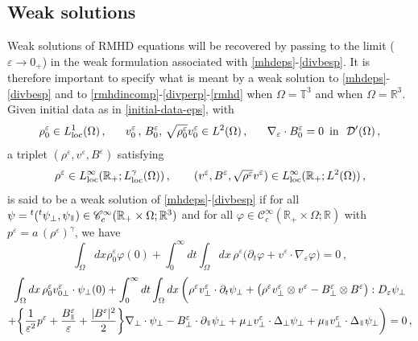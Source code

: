 \documentclass[11pt,reqno]{amsart}
\def \R{{\mathbb{R}}}
\def \T{{\mathbb{T}}}
\newcommand{\myparallel}{{\mkern3mu\vphantom{\perp}\vrule depth 0pt\mkern2mu\vrule depth 0pt\mkern3mu}}
\begin{document}
\subsection{Weak solutions}
\label{ss:ws} Weak solutions of  RMHD equations will be recovered by passing to the limit ($\varepsilon \rightarrow  0_+$) in the weak formulation associated with \eqref{mhdeps}-\eqref{divbesp}. It is therefore important to specify what is meant by a  weak solution to \eqref{mhdeps}-\eqref{divbesp} and to \eqref{rmhdincomp}-\eqref{divperp}-\eqref{rmhd} when $\Omega=\T^3$ and when $\Omega=\R^3$. Given initial data as in \eqref{initial-data-eps}, with
\begin{equation}
  \label{initial-data-ws}
  \rho_0^\varepsilon \in L_{\rm loc}^1(\Omega)\,, \quad \ \ 
  v_0^\varepsilon\,, \, B_0^\varepsilon, \, \sqrt{\rho_0^\varepsilon} v_0^\varepsilon \in L^2(\Omega)\,,\quad \ \ 
  \nabla_\varepsilon \cdot B_0^\varepsilon =0 \ \, \mbox{in }\  \mathcal{D}'(\Omega)\,,
\end{equation}
a triplet $(\rho^\varepsilon,v^\varepsilon, B^\varepsilon)$ satisfying
\begin{equation}
  \label{reg-triplet}
  \rho^\varepsilon \in L_{\rm loc}^\infty (\R_+; L_{\rm loc}^\gamma(\Omega))\,, \qquad
  (v^\varepsilon ,B^\varepsilon,  \sqrt{\rho^\varepsilon} v^\varepsilon ) \in L_{\rm loc}^\infty (\R_+; L^2(\Omega))\,,
\end{equation}
is said to be a weak solution of \eqref{mhdeps}-\eqref{divbesp} if for all $ \psi={}^t({}^t\psi_\perp,\psi_\myparallel) \in \mathscr{C}_c^\infty(\R_+\times\Omega;\R^3)$ and for all $ \varphi\in \mathscr{C}_c^\infty(\R_+\times\Omega;\R)$ with $ p^\varepsilon = a \, (\rho^\varepsilon)^\gamma $, we have
\begin{equation}
\label{eq:rho-eps}
\int_\Omega dx \rho_0^\varepsilon \varphi(0) +
\int_0^\infty dt \int_\Omega dx \, \rho^\varepsilon\big(\partial_t  \varphi+ v^\varepsilon \cdot \nabla_\varepsilon \varphi\big) =0 \,,
\end{equation}      
\begin{multline}
\label{eq:vperp-eps}
\int_\Omega dx \,\rho_0^\varepsilon v_{0 \perp }^\varepsilon \cdot \psi_\perp(0)
+\int_0^\infty dt \int_\Omega dx\,  \bigg( \rho^\varepsilon v_{\perp }^\varepsilon \cdot \partial_t \psi_\perp
+ \big(\rho^\varepsilon v_{\perp }^\varepsilon \otimes  v^\varepsilon 
- B_{\perp }^\varepsilon \otimes  B^\varepsilon \big): D_\varepsilon \psi_\perp 
\\ + \bigg\{ \frac{1}{\varepsilon^2} p^\varepsilon + \frac{B_\myparallel^\varepsilon}{\varepsilon}
+ \frac{|B^\varepsilon|^2}{2}\bigg\} \nabla_\perp \cdot \psi_\perp
- B_\perp^\varepsilon \cdot \partial_\myparallel \psi_\perp 
+ \mu_\perp v_{\perp }^\varepsilon \cdot \Delta_\perp \psi_\perp + \mu_\myparallel v_{\perp }^\varepsilon \cdot \Delta_\myparallel \psi_\perp 
\bigg) =0 \,,
\end{multline}
\end{document}
